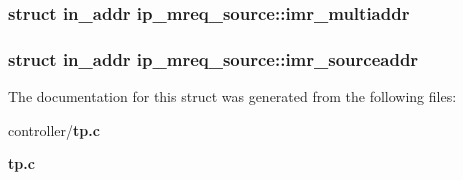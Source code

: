 \subsubsection[{imr\_\-multiaddr}]{\setlength{\rightskip}{0pt plus 5cm}struct {\bf in\_\-addr} {\bf ip\_\-mreq\_\-source::imr\_\-multiaddr}}\label{structip__mreq__source_ad5bc88005eebbe0e0f0d1613f9be2015}
\subsubsection[{imr\_\-sourceaddr}]{\setlength{\rightskip}{0pt plus 5cm}struct {\bf in\_\-addr} {\bf ip\_\-mreq\_\-source::imr\_\-sourceaddr}}\label{structip__mreq__source_a19863a6206d9631eb18acc9347bb74e6}


The documentation for this struct was generated from the following files:\begin{DoxyCompactItemize}
\item 
controller/{\bf tp.c}\item 
{\bf tp.c}\end{DoxyCompactItemize}
